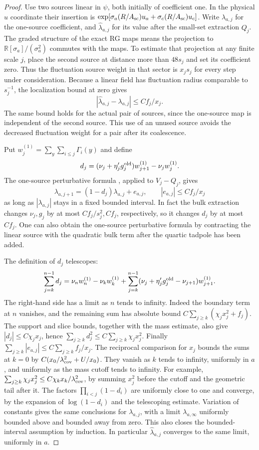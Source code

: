 \documentclass[11pt]{article}
\begin{document}
\begin{proof}
Use two sources linear in \(\psi\), both initially of coefficient
one. In the physical \(u\) coordinate their insertion is
\(\exp[\sigma_a(R/A_{\rm sc})u_a+\sigma_c(R/A_{\rm sc})u_c]\).
Write \(\lambda_{a,j}\) for the one-source coefficient, and
\(\widehat\lambda_{a,j}\) for its value after the small-set
extraction \(Q_j\). The graded structure of the exact RG maps
means the projection to \(\mathbb R[\sigma_a]/(\sigma_a^2)\)
commutes with the maps. To estimate that projection at any
finite scale \(j\), place the second source at distance more
than \(48s_j\) and set its coefficient zero. Thus the
fluctuation source weight in that sector is \(x_j s_j\) for
every step under consideration. Because a linear field has
fluctuation radius comparable to \(s_j^{-1}\), the localization
bound at zero gives
\[
 |\widehat\lambda_{a,j}-\lambda_{a,j}|
       \le C f_j/x_j.
\]
The same bound holds for the actual pair of sources, since the
one-source map is independent of the second source. This use of
an unused source avoids the decreased fluctuation weight for a
pair after its coalescence.

Put \(w_j^{(1)}=\sum_y\sum_{i\le j}\Gamma_i(y)\) and define
\[
 d_j=(\nu_j+\eta'_jg_j^{\rm old})w_{j+1}^{(1)}
                                      -\nu_j w_j^{(1)}.
\]
The one-source perturbative formula
\cite[(A.7)--(A.10)]{ParkTorus}, applied to \(V_j-Q_j\),
gives
\[
 \lambda_{a,j+1}=(1-d_j)\lambda_{a,j}+e_{a,j},
 \qquad |e_{a,j}|\le Cf_j/x_j
\]
as long as \(|\lambda_{a,j}|\) stays in a fixed bounded
interval. In fact the bulk extraction changes \(\nu_j,g_j\)
by at most \(Cf_j/s_j^2,Cf_j\),
respectively, so it changes \(d_j\) by at most \(Cf_j\).
One can also obtain the one-source perturbative formula by
contracting the linear source with the quadratic bulk term
after the quartic tadpole has been added.

The definition of \(d_j\) telescopes:
\[
 \sum_{j=k}^{n-1}d_j
  =\nu_nw_n^{(1)}-\nu_kw_k^{(1)}
    +\sum_{j=k}^{n-1}(\nu_j+\eta'_jg_j^{\rm old}-\nu_{j+1})
       w_{j+1}^{(1)}.
\]
The right-hand side has a limit as \(n\) tends to infinity.
Indeed the boundary term at \(n\) vanishes, and the remaining
sum has absolute bound
\(C\sum_{j\ge k}(\chi_jx_j^2+f_j)\).
The support and slice bounds, together with the mass estimate,
also give \(|d_j|\le C\chi_jx_j\), hence
\(\sum_{j\ge k}d_j^2\le C\sum_{j\ge k}\chi_jx_j^2\).
Finally
\(\sum_{j\ge k}|e_{a,j}|\le C\sum_{j\ge k}f_j/x_j\).
The reciprocal comparison for \(x_j\) bounds the sums at \(k=0\)
by \(C(x_0/\lambda_{\rm cov}^2+U/x_0)\). They vanish as \(k\) tends to
infinity, uniformly in \(a\), and uniformly as the mass cutoff
tends to infinity. For example,
\(\sum_{j\ge k}\chi_jx_j^2\le C\chi_k x_k/\lambda_{\rm cov}^2\), by summing
\(x_j^2\) before the cutoff and the geometric tail after it.
The factors \(\prod_{i<j}(1-d_i)\) are uniformly close to one
and converge, by the expansion of \(\log(1-d_i)\) and the
telescoping estimate. Variation of constants gives the same
conclusions for \(\lambda_{a,j}\), with a limit
\(\lambda_{a,\infty}\) uniformly bounded above and bounded away
from zero. This also closes the bounded-interval assumption by
induction. In particular \(\widehat\lambda_{a,j}\) converges to
the same limit, uniformly in \(a\).


\end{proof}
\end{document}
